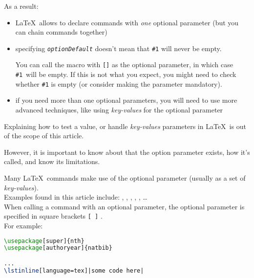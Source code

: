 \bigskip

As a result:
\begin{itemize}
	\item \LaTeX\ allows to declare commands with \emph{one} optional parameter (but you can chain commands together)
	
	\item specifying \texttt{\emph{optionDefault}} doesn't mean that \texttt{\#1} will never be empty. 
	
	You can call the macro with \texttt{[]} as the optional parameter, in which case \texttt{\#1}~will be empty. If this is not what you expect, you might need to check whether \texttt{\#1} is empty (or consider making the parameter mandatory).
	
	\item if you need more than one optional parameters, you will need to use more advanced techniques, like using \emph{key-values} for the optional parameter
\end{itemize}



\begin{note}
Explaining how to test a value, or handle \emph{key-values} parameters in \LaTeX\ is out of the scope of this article.

However, it is important to know about that the option parameter exists, how it's called, and know its limitations.
\end{note}

\bigskip

Many \LaTeX\ commands make use of the optional parameter (usually as a set of \emph{key-values}). \\

Examples found in this article include: 
, , , , , \dots \\


When calling a command with an optional parameter, the optional parameter is specified in square brackets \texttt{[ ]} . \\

For example:
\begin{lstlisting}[language=tex]
\usepackage[super]{nth}
\usepackage[authoryear]{natbib}

...
\lstinline[language=tex]|some code here|

\end{lstlisting}


